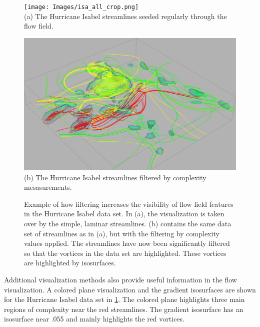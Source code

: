 \documentclass{egpubl}
\begin{document}
\begin{figure}[h]
        \centering
                \begin{minipage}{1\linewidth}
                        \texttt{[image: Images/isa\_all\_crop.png]}\\(a) The Hurricane Isabel streamlines seeded regularly through the flow field. \vspace{0.2em}
                \end{minipage}
                \begin{minipage}{1\linewidth}
                        \includegraphics[height = .62\linewidth]{Images/isa_iso_crop.png}\\(b) The Hurricane Isabel streamlines filtered by complexity mesasurements. \vspace{0.2em}
                \end{minipage}
        \caption{Example of how filtering increases the visibility of flow field features in the Hurricane Isabel data set. In (a), the visualization is taken over by the simple, laminar streamlines. (b) contains the same data set of streamlines as in (a), but with the filtering by complexity values applied. The streamlines have now been significantly filtered so that the vortices in the data set are highlighted. These vortices are highlighted by isosurfaces.}
        \label{fig:isa_lines}
\end{figure}

Additional visualization methods also provide useful information in the flow visualization.
A colored plane visualization and the gradient isosurfaces are shown for the Hurricane Isabel data set in \ref{fig:isa_lines}.
The colored plane highlights three main regions of complexity near the red streamlines.
The gradient isosurface has an isosurface near .055 and mainly highlights the red vortices.
\end{document}
